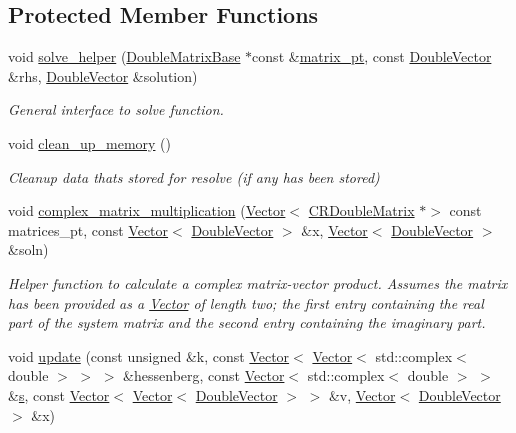\subsection*{Protected Member Functions}
\begin{DoxyCompactItemize}
\item 
void \hyperlink{classoomph_1_1HelmholtzGMRESMG_a3147aa77b5e71a0822cc5c661dd07e0d}{solve\+\_\+helper} (\hyperlink{classoomph_1_1DoubleMatrixBase}{Double\+Matrix\+Base} $\ast$const \&\hyperlink{classoomph_1_1BlockPreconditioner_a9aac48fd53e579e6db8eeed58933a14b}{matrix\+\_\+pt}, const \hyperlink{classoomph_1_1DoubleVector}{Double\+Vector} \&rhs, \hyperlink{classoomph_1_1DoubleVector}{Double\+Vector} \&solution)
\begin{DoxyCompactList}\small\item\em General interface to solve function. \end{DoxyCompactList}\item 
void \hyperlink{classoomph_1_1HelmholtzGMRESMG_a81ddd10ccc03d6582dcadbd5cae1edda}{clean\+\_\+up\+\_\+memory} ()
\begin{DoxyCompactList}\small\item\em Cleanup data that\textquotesingle{}s stored for resolve (if any has been stored) \end{DoxyCompactList}\item 
void \hyperlink{classoomph_1_1HelmholtzGMRESMG_a01706513b6f3488149c7aabcb2093fcc}{complex\+\_\+matrix\+\_\+multiplication} (\hyperlink{classoomph_1_1Vector}{Vector}$<$ \hyperlink{classoomph_1_1CRDoubleMatrix}{C\+R\+Double\+Matrix} $\ast$$>$ const matrices\+\_\+pt, const \hyperlink{classoomph_1_1Vector}{Vector}$<$ \hyperlink{classoomph_1_1DoubleVector}{Double\+Vector} $>$ \&x, \hyperlink{classoomph_1_1Vector}{Vector}$<$ \hyperlink{classoomph_1_1DoubleVector}{Double\+Vector} $>$ \&soln)
\begin{DoxyCompactList}\small\item\em Helper function to calculate a complex matrix-\/vector product. Assumes the matrix has been provided as a \hyperlink{classoomph_1_1Vector}{Vector} of length two; the first entry containing the real part of the system matrix and the second entry containing the imaginary part. \end{DoxyCompactList}\item 
void \hyperlink{classoomph_1_1HelmholtzGMRESMG_ac08841fffc51bceb21122cd66988329b}{update} (const unsigned \&k, const \hyperlink{classoomph_1_1Vector}{Vector}$<$ \hyperlink{classoomph_1_1Vector}{Vector}$<$ std\+::complex$<$ double $>$ $>$ $>$ \&hessenberg, const \hyperlink{classoomph_1_1Vector}{Vector}$<$ std\+::complex$<$ double $>$ $>$ \&\hyperlink{cfortran_8h_ab7123126e4885ef647dd9c6e3807a21c}{s}, const \hyperlink{classoomph_1_1Vector}{Vector}$<$ \hyperlink{classoomph_1_1Vector}{Vector}$<$ \hyperlink{classoomph_1_1DoubleVector}{Double\+Vector} $>$ $>$ \&v, \hyperlink{classoomph_1_1Vector}{Vector}$<$ \hyperlink{classoomph_1_1DoubleVector}{Double\+Vector} $>$ \&x)
$$
\end{DoxyCompactItemize}
